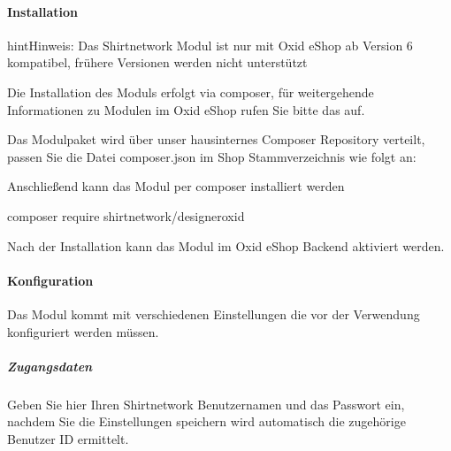 \documentclass[letterpaper,10pt,ngerman]{sphinxmanual}
\begin{document}
\paragraph{Installation}
\label{\detokenize{modules/oxid/install:installation}}\label{\detokenize{modules/oxid/install::doc}}
\begin{sphinxadmonition}{hint}{Hinweis:}
Das Shirtnetwork Modul ist nur mit Oxid eShop ab Version 6 kompatibel, frühere Versionen werden nicht unterstützt
\end{sphinxadmonition}

Die Installation des Moduls erfolgt via composer, für weitergehende Informationen zu Modulen im Oxid eShop rufen Sie bitte
das  auf.

Das Modulpaket wird über unser hausinternes Composer Repository verteilt, passen Sie die Datei composer.json im Shop Stammverzeichnis
wie folgt an:

\begin{sphinxVerbatim}[commandchars=\\\{\}]
   \PYG{p}{[}
     
     
  \PYG{p}{]}
\end{sphinxVerbatim}

Anschließend kann das Modul per composer installiert werden

\begin{sphinxVerbatim}[commandchars=\\\{\}]
composer require shirtnetwork/designer\PYGZhy{}oxid
\end{sphinxVerbatim}

Nach der Installation kann das Modul im Oxid eShop Backend aktiviert werden.


\paragraph{Konfiguration}
\label{\detokenize{modules/oxid/settings:konfiguration}}\label{\detokenize{modules/oxid/settings::doc}}
Das Modul kommt mit verschiedenen Einstellungen die vor der Verwendung konfiguriert werden müssen.


\subparagraph{Zugangsdaten}
\label{\detokenize{modules/oxid/settings:zugangsdaten}}
Geben Sie hier Ihren Shirtnetwork Benutzernamen und das Passwort ein, nachdem Sie die Einstellungen speichern wird
automatisch die zugehörige Benutzer ID ermittelt.
\end{document}
